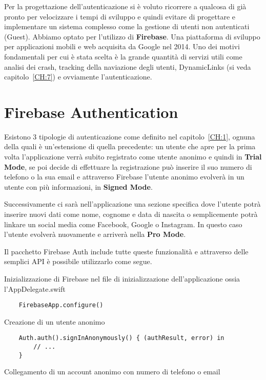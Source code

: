 
Per la progettazione dell'autenticazione si è voluto ricorrere a qualcosa di 
già pronto per velocizzare i tempi di sviluppo e quindi evitare di progettare e implementare un sistema 
complesso come la gestione di utenti non autenticati (Guest).
Abbiamo optato per l'utilizzo di \textbf{Firebase}\cite{firebase}.
Una piattaforma di sviluppo per applicazioni mobili e web acquisita da Google nel 2014. 
Uno dei motivi fondamentali per cui è stata scelta è la grande quantità di servizi utili come
analisi dei crash, tracking della naviazione degli utenti, DynamicLinks (si veda capitolo~\ref{CH:7})
e ovviamente l'autenticazione.

\section{Firebase Authentication}

Esistono 3 tipologie di autenticazione come definito nel capitolo~\ref{CH:1}, ognuna della quali è un'estensione
di quella precedente: un utente che apre per la prima volta l'applicazione verrà subito registrato 
come utente anonimo e quindi in \textbf{Trial Mode}, se poi decide di effettuare la registrazione può inserire 
il suo numero di telefono o la sua email e attraverso Firebase l'utente anonimo evolverà in un utente con più
informazioni, in \textbf{Signed Mode}.

Successivamente ci sarà nell'applicazione una sezione specifica dove l'utente potrà inserire nuovi dati come nome, cognome e data di nascita
o semplicemente potrà linkare un social media come Facebook, Google o Instagram. In questo caso l'utente evolverà nuovamente 
e arriverà nella \textbf{Pro Mode}.

Il pacchetto Firebase Auth include tutte queste funzionalità e attraverso delle semplici API
è possibile utilizzarlo come segue.

Inizializzazione di Firebase nel file di inizializzazione dell'applicazione ossia l'AppDelegate.swift

\begin{verbatim}
    FirebaseApp.configure()
\end{verbatim}

Creazione di un utente anonimo

\begin{verbatim}
    Auth.auth().signInAnonymously() { (authResult, error) in
        // ...
    }
\end{verbatim}

Collegamento di un account anonimo con numero di telefono o email

